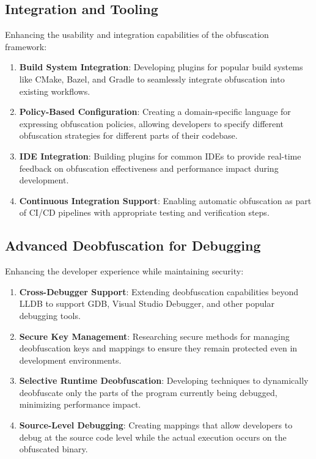 \documentclass[conference]{IEEEtran}
\begin{document}
\subsection{Integration and Tooling}

Enhancing the usability and integration capabilities of the obfuscation framework:

\begin{enumerate}
    \item \textbf{Build System Integration}: Developing plugins for popular build systems like CMake, Bazel, and Gradle to seamlessly integrate obfuscation into existing workflows.
    
    \item \textbf{Policy-Based Configuration}: Creating a domain-specific language for expressing obfuscation policies, allowing developers to specify different obfuscation strategies for different parts of their codebase.
    
    \item \textbf{IDE Integration}: Building plugins for common IDEs to provide real-time feedback on obfuscation effectiveness and performance impact during development.
    
    \item \textbf{Continuous Integration Support}: Enabling automatic obfuscation as part of CI/CD pipelines with appropriate testing and verification steps.
\end{enumerate}

\subsection{Advanced Deobfuscation for Debugging}

Enhancing the developer experience while maintaining security:

\begin{enumerate}
    \item \textbf{Cross-Debugger Support}: Extending deobfuscation capabilities beyond LLDB to support GDB, Visual Studio Debugger, and other popular debugging tools.
    
    \item \textbf{Secure Key Management}: Researching secure methods for managing deobfuscation keys and mappings to ensure they remain protected even in development environments.
    
    \item \textbf{Selective Runtime Deobfuscation}: Developing techniques to dynamically deobfuscate only the parts of the program currently being debugged, minimizing performance impact.
    
    \item \textbf{Source-Level Debugging}: Creating mappings that allow developers to debug at the source code level while the actual execution occurs on the obfuscated binary.
\end{enumerate}
\end{document}
